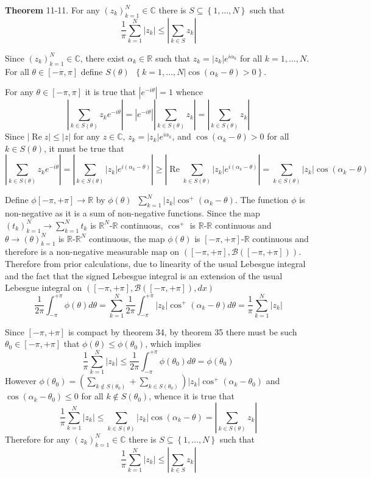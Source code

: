 \documentclass[a4paper]{article}
\newcommand{\obj}[1]{\left\{ #1 \right \}}
\newcommand{\clo}[1]{\left [ #1 \right ]}
\newcommand{\brac}[1]{\left ( #1 \right )}
\newcommand{\induc}[1]{\left . #1 \right \vert}
\newcommand{\abs}[1]{\left | #1 \right |}
\newcommand{\Real}{\mathbb{R}}
\newcommand{\Cplx}{\mathbb{C}}
\newcommand{\borel}[1]{\mathcal{B}\brac{#1}}
\newcommand{\defn}{\mathop{\overset{\Delta}{=}}\nolimits}
\newcommand{\re}{\operatorname{Re}\nolimits}
\begin{document}
\label{thm:reverse_triangle_law} \noindent \textbf{Theorem} 11-11.
For any $\brac{z_k}_{k=1}^N\in \Cplx$ there is $S\subseteq \obj{1,\ldots,N}$ such that \[\frac{1}{\pi} \sum_{k=1}^N \abs{z_k} \leq \abs{ \sum_{k\in S} z_k }\]

Since $\brac{z_k}_{k=1}^N\in \Cplx$, there exist $\alpha_k\in \Real$ such that $z_k = \abs{z_k}e^{i \alpha_k}$ for all $k=1,\ldots,N$. For all $\theta\in \clo{-\pi, \pi}$ define $S\brac{\theta}\defn \obj{\induc{ k=1,\ldots,N} \cos\brac{\alpha_k-\theta}>0 }$.

For any $\theta\in \clo{-\pi,\pi}$ it is true that $\abs{e^{-i\theta}}=1$ whence \[\abs{\sum_{k\in S\brac{\theta}} z_k e^{-i\theta} } = \abs{e^{-i\theta}} \abs{ \sum_{k\in S\brac{\theta}} z_k }= \abs{\sum_{k\in S\brac{\theta}} z_k }\] Since $\abs{\re z} \leq \abs{z}$ for any $z\in \Cplx$, $z_k=\abs{z_k} e^{i\alpha_k}$, and $\cos\brac{\alpha_k-\theta}>0$ for all $k\in S\brac{\theta}$, it must be true that \[\abs{\sum_{k\in S\brac{\theta}} z_k e^{-i\theta} } = \abs{\sum_{k\in S\brac{\theta}} \abs{z_k} e^{i\brac{\alpha_k-\theta} } } \geq \abs{ \re\sum_{k\in S\brac{\theta}} \abs{z_k} e^{i\brac{\alpha_k-\theta}} } = \sum_{k\in S\brac{\theta}} \abs{z_k} \cos\brac{\alpha_k-\theta}\]

Define $\phi\clo{-\pi, +\pi} \to \Real$ by $\phi\brac{\theta}\defn \sum_{k=1}^N \abs{z_k} \cos^+\brac{\alpha_k-\theta}$. The function $\phi$ is non-negative as it is a sum of non-negative functions. Since the map $\brac{t_k}_{k=1}^N\to \sum_{k=1}^N t_k$ is $\Real^N$-$\Real$ continuous, $\cos^+$ is $\Real$-$\Real$ continuous and $\theta\to\brac{\theta}_{k=1}^N$ is $\Real$-$\Real^N$ continuous, the map $\phi\brac{\theta}$ is $\clo{-\pi, +\pi}$-$\Real$ continuous and therefore is a non-negative measurable map on $\brac{\clo{-\pi, +\pi}, \borel{\clo{-\pi, +\pi}}}$. Therefore from prior calculations, due to linearity of the usual Lebesgue integral and the fact that the signed Lebesgue integral is an extension of the usual Lebesgue integral on $\brac{\clo{-\pi, +\pi}, \borel{\clo{-\pi, +\pi}},dx}$ \[\frac{1}{2\pi}\int_{-\pi}^{+\pi} \phi\brac{\theta} d\theta = \sum_{k=1}^N \frac{1}{2\pi} \int_{-\pi}^{+\pi} \abs{z_k}\cos^+\brac{\alpha_k - \theta} d\theta = \frac{1}{\pi} \sum_{k=1}^N \abs{z_k}\]

Since $\clo{-\pi, +\pi}$ is compact by theorem 34, by theorem 35 there must be such $\theta_0\in \clo{-\pi,+\pi}$ that $\phi\brac{\theta}\leq \phi\brac{\theta_0}$, which implies \[\frac{1}{\pi} \sum_{k=1}^N \abs{z_k} \leq \frac{1}{2\pi}\int_{-\pi}^{+\pi} \phi\brac{\theta_0} d\theta = \phi\brac{\theta_0}\] However $\phi\brac{\theta_0} = \brac{ \sum_{k\notin S\brac{\theta_0}} + \sum_{k\in S\brac{\theta_0}} } \abs{z_k} \cos^+\brac{\alpha_k-\theta_0}$ and $\cos\brac{\alpha_k-\theta_0}\leq 0$ for all $k\notin S\brac{\theta_0}$, whence it is true that \[\frac{1}{\pi} \sum_{k=1}^N \abs{z_k} \leq \sum_{k\in S\brac{\theta}} \abs{z_k} \cos\brac{\alpha_k-\theta} = \abs{\sum_{k\in S\brac{\theta}} z_k } \] Therefore for any $\brac{z_k}_{k=1}^N\in \Cplx$ there is $S\subseteq \obj{1,\ldots,N}$ such that \[\frac{1}{\pi} \sum_{k=1}^N \abs{z_k} \leq \abs{ \sum_{k\in S} z_k }\]\\
\end{document}
